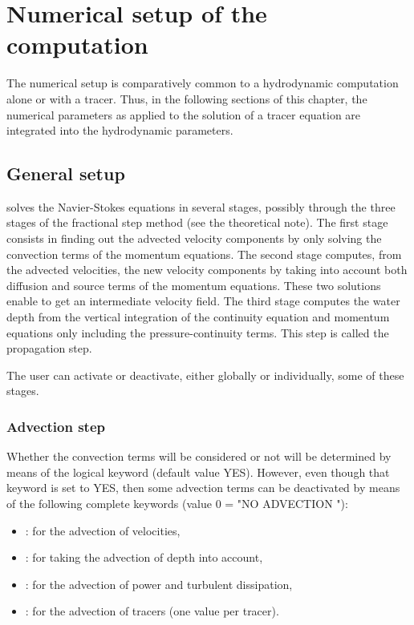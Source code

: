 \chapter{Numerical setup of the computation}

The numerical setup is comparatively common to a hydrodynamic computation alone
or with a tracer. Thus, in the following sections of this chapter, the
numerical parameters as applied to the solution of a tracer equation are
integrated into the hydrodynamic parameters.

\section{General setup}

 solves the Navier-Stokes equations in several stages, possibly
through the three stages of the fractional step method (see the theoretical
note). The first stage consists in finding out the advected velocity components
by only solving the convection terms of the momentum equations. The second
stage computes, from the advected velocities, the new velocity components by
taking into account both diffusion and source terms of the momentum equations.
These two solutions enable to get an intermediate velocity field. The third
stage computes the water depth from the vertical integration of the continuity
equation and momentum equations only including the pressure-continuity terms.
This step is called the propagation step.

The user can activate or deactivate, either globally or individually, some of
these stages.


\subsection{Advection step}
Whether the convection terms will be considered or not will be determined by
means of the logical keyword  (default
value YES). However, even though that keyword is set to YES, then some
advection terms can be deactivated by means of the following complete keywords
(value 0 = "NO ADVECTION "):

\begin{itemize}
\item {}: for the advection of
velocities,

\item {}: for taking the advection of
depth into account,

\item {}: for the advection of power
and turbulent dissipation,

\item {}: for the advection of tracers
(one value per tracer).
\end{itemize}

